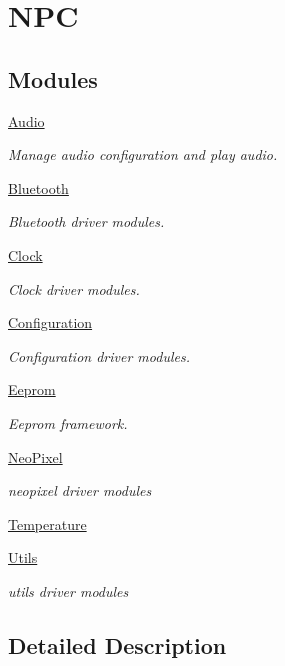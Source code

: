 \hypertarget{group___n_p_c}{}\section{N\+PC}
\label{group___n_p_c}
\subsection*{Modules}
\begin{DoxyCompactItemize}
\item 
\hyperlink{group___audio}{Audio}
\begin{DoxyCompactList}\small\item\em Manage audio configuration and play audio. \end{DoxyCompactList}\item 
\hyperlink{group___bluetooth}{Bluetooth}
\begin{DoxyCompactList}\small\item\em Bluetooth driver modules. \end{DoxyCompactList}\item 
\hyperlink{group___clock}{Clock}
\begin{DoxyCompactList}\small\item\em Clock driver modules. \end{DoxyCompactList}\item 
\hyperlink{group___configuration}{Configuration}
\begin{DoxyCompactList}\small\item\em Configuration driver modules. \end{DoxyCompactList}\item 
\hyperlink{group___eeprom}{Eeprom}
\begin{DoxyCompactList}\small\item\em Eeprom framework. \end{DoxyCompactList}\item 
\hyperlink{group___neo_pixel}{Neo\+Pixel}
\begin{DoxyCompactList}\small\item\em neopixel driver modules \end{DoxyCompactList}\item 
\hyperlink{group___temperature}{Temperature}
\item 
\hyperlink{group___utils}{Utils}
\begin{DoxyCompactList}\small\item\em utils driver modules \end{DoxyCompactList}\end{DoxyCompactItemize}


\subsection{Detailed Description}
